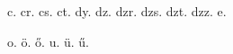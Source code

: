 \documentclass[12pt]{article}
\begin{document}
\thispagestyle{empty}

c.
cr.
cs.
ct.
dy.
dz.
dzr.
dzs.
dzt.
dzz.
e.

o.
ö.
ő.
u.
ü.
ű.

\printindex
\end{document}
